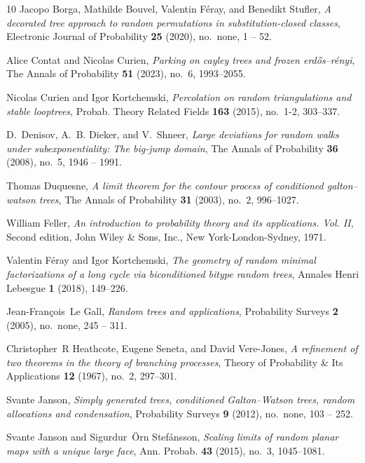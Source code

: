\documentclass[a4paper,11pt]{article}
\begin{document}
\begin{thebibliography}{10}
Jacopo Borga, Mathilde Bouvel, Valentin F{\'e}ray, and Benedikt Stufler,
  \emph{{A decorated tree approach to random permutations in
  substitution-closed classes}}, Electronic Journal of Probability \textbf{25}
  (2020), no.~none, 1 -- 52.

Alice Contat and Nicolas Curien, \emph{Parking on cayley trees and frozen
  erd{\H{o}}s--r{\'e}nyi}, The Annals of Probability \textbf{51} (2023), no.~6,
  1993--2055.

Nicolas Curien and Igor Kortchemski, \emph{Percolation on random triangulations
  and stable looptrees}, Probab. Theory Related Fields \textbf{163} (2015),
  no.~1-2, 303--337. 

D.~Denisov, A.~B. Dieker, and V.~Shneer, \emph{{Large deviations for random
  walks under subexponentiality: The big-jump domain}}, The Annals of
  Probability \textbf{36} (2008), no.~5, 1946 -- 1991.

Thomas Duquesne, \emph{A limit theorem for the contour process of conditioned
  galton--watson trees}, The Annals of Probability \textbf{31} (2003), no.~2,
  996--1027.

William Feller, \emph{An introduction to probability theory and its
  applications. {V}ol. {II}}, Second edition, John Wiley \& Sons, Inc., New
  York-London-Sydney, 1971. 

Valentin F{\'e}ray and Igor Kortchemski, \emph{The geometry of random minimal
  factorizations of a long cycle via biconditioned bitype random trees},
  Annales Henri Lebesgue \textbf{1} (2018), 149--226.

Jean-Fran{\c{c}}ois~Le Gall, \emph{{Random trees and applications}},
  Probability Surveys \textbf{2} (2005), no.~none, 245 -- 311.

Christopher~R Heathcote, Eugene Seneta, and David Vere-Jones, \emph{A
  refinement of two theorems in the theory of branching processes}, Theory of
  Probability \& Its Applications \textbf{12} (1967), no.~2, 297--301.

Svante Janson, \emph{{Simply generated trees, conditioned Galton–Watson
  trees, random allocations and condensation}}, Probability Surveys \textbf{9}
  (2012), no.~none, 103 -- 252.

Svante Janson and Sigurdur~\"Orn Stef\'ansson, \emph{Scaling limits of random
  planar maps with a unique large face}, Ann. Probab. \textbf{43} (2015),
  no.~3, 1045--1081. 


\end{thebibliography}
\end{document}
